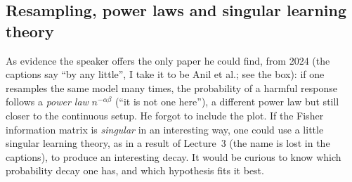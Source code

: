 \subsection{Resampling, power laws and singular learning theory}\label{sec:L7-power}
As evidence the speaker offers the only paper he could find, from 2024 (the captions say ``by any little'', I take it to be Anil et al.\flag; see the box): if one resamples the same model many times, the probability of a harmful response follows a \emph{power law} $n^{-\alpha\beta}$ (``it is not one here''), a different power law but still closer to the continuous setup. He forgot to include the plot. If the Fisher information matrix is \emph{singular} in an interesting way, one could use a little singular learning theory, as in a result of Lecture~3 (the name is lost in the captions), to produce an interesting decay. It would be curious to know which probability decay one has, and which hypothesis fits it best.

